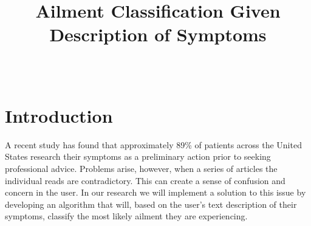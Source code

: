 \documentclass[12pt, final, onecolumn, comsoc, conference]{IEEEtran}
\begin{document}
\title{Ailment Classification Given Description of Symptoms}
\author{
	\\
}

\maketitle
\section{Introduction}
A recent study has found that approximately 89\% of patients across the United States
research their symptoms as a preliminary action prior to seeking professional advice.
Problems arise, however, when a series of articles the individual reads are contradictory.
This can create a sense of confusion and concern in the user.
In our research we will implement a solution to this issue by developing an algorithm that will,
based on the user's text description of their symptoms, classify the most likely ailment
they are experiencing.
\end{document}
